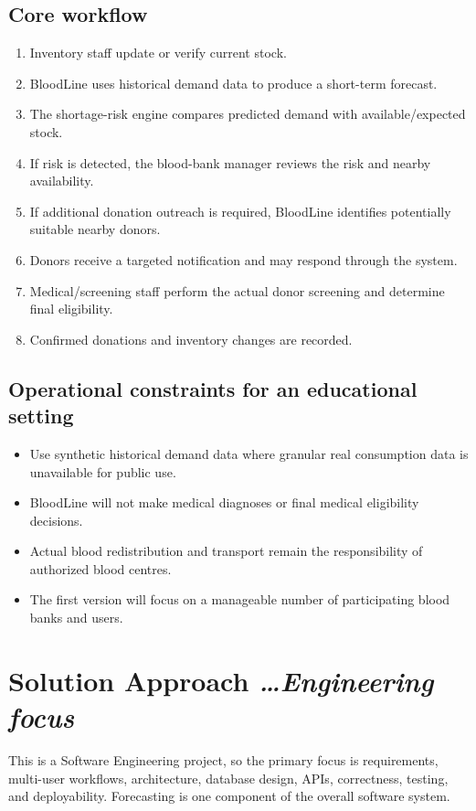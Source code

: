 \documentclass[11pt,a4paper]{article}
\newcommand{\BvrHint}[1]{{\normalfont\normalsize\itshape\hfill #1}}
\begin{document}
\subsection{Core workflow}
\begin{enumerate}[leftmargin=0.7cm]
\item Inventory staff update or verify current stock.
\item BloodLine uses historical demand data to produce a short-term forecast.
\item The shortage-risk engine compares predicted demand with available/expected stock.
\item If risk is detected, the blood-bank manager reviews the risk and nearby availability.
\item If additional donation outreach is required, BloodLine identifies potentially suitable nearby donors.
\item Donors receive a targeted notification and may respond through the system.
\item Medical/screening staff perform the actual donor screening and determine final eligibility.
\item Confirmed donations and inventory changes are recorded.
\end{enumerate}

\subsection{Operational constraints for an educational setting}
\begin{itemize}[leftmargin=0.7cm]
\item Use synthetic historical demand data where granular real consumption data is unavailable for public use.
\item BloodLine will not make medical diagnoses or final medical eligibility decisions.
\item Actual blood redistribution and transport remain the responsibility of authorized blood centres.
\item The first version will focus on a manageable number of participating blood banks and users.
\end{itemize}

\section{Solution Approach \BvrHint{\ldots Engineering focus}}
This is a Software Engineering project, so the primary focus is requirements, multi-user workflows, architecture, database design, APIs, correctness, testing, and deployability. Forecasting is one component of the overall software system.
\end{document}
